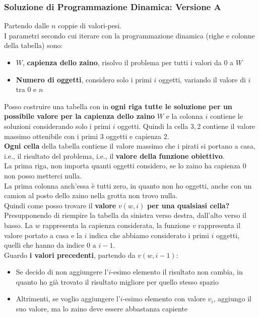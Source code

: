 \documentclass[11pt]{article}
\begin{document}
	\newpage
	
	\subsubsection{Soluzione di Programmazione Dinamica: Versione A}
	
	Partendo dalle $n$ coppie di valori-pesi.\\
	
	I parametri secondo cui iterare con la programmazione dinamica (righe e colonne della tabella) sono: 
	\begin{itemize}
		\item $W$, \textbf{capienza dello zaino}, risolvo il problema per tutti i valori da 0 a $W$
		\item \textbf{Numero di oggetti}, considero solo i primi $i$ oggetti, variando il valore di $i$ tra 0 e $n$
	\end{itemize}
	
	Posso costruire una tabella con in \textbf{ogni riga tutte le soluzione per un possibile valore per la capienza dello zaino} $W$ e la colonna $i$ contiene le soluzioni considerando solo i primi $i$ oggetti. Quindi la cella $3,2$ contiene il valore massimo ottenibile con i primi $3$ oggetti e capienza $2$.\\
	
	\textbf{Ogni cella} della tabella contiene il valore massimo che i pirati si portano a casa, i.e., il risultato del problema, i.e., il \textbf{valore della funzione obiettivo}.\\
	
	La prima riga, non importa  quanti oggetti considero, se lo zaino ha capienza 0 non posso metterci nulla.\\
	La prima colonna anch'essa è tutti zero, in quanto non ho oggetti, anche con un camion al posto dello zaino nella grotta non trovo nulla.\\
	
	Quindi come posso trovare il \textbf{valore} $v(w,i)$ \textbf{per una qualsiasi cella?} Presupponendo di riempire la tabella da sinistra verso destra, dall'alto verso il basso. La $w$ rappresenta la capienza considerata, la funzione $v$ rappresenta il valore portato a casa e la $i$ indica che abbiamo considerato i primi $i$ oggetti, quelli che hanno da indice 0 a $i-1$.\\
	
	Guardo \textbf{i valori precedenti}, partendo da $v(w,i-1)$:
	\begin{itemize}
		\item Se decido di non aggiungere l'$i$-esimo elemento il risultato non cambia, in quanto ho già trovato il risultato migliore per quello stesso spazio
		\item Altrimenti, se voglio aggiungere l'$i$-esimo elemento con valore $v_i$, aggiungo il suo valore, ma lo zaino deve essere abbastanza capiente
	\end{itemize}
	
\end{document}
